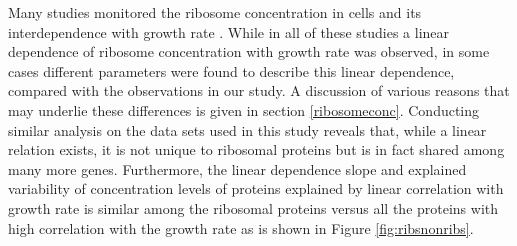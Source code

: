 Many studies monitored the ribosome concentration in cells and its interdependence with growth rate \cite{Scott2010,Schaechter1958,Bremer,Zaslaver2009,Bremer1987}.
While in all of these studies a linear dependence of ribosome concentration with growth rate was observed, in some cases different parameters were found to describe this linear dependence, compared with the observations in our study.
A discussion of various reasons that may underlie these differences is given in section \ref{ribosomeconc}.
Conducting similar analysis on the data sets used in this study reveals that, while a linear relation exists, it is not unique to ribosomal proteins but is in fact shared among many more genes.
Furthermore, the linear dependence slope and explained variability of concentration levels of proteins explained by linear correlation with growth rate is similar among the ribosomal proteins versus all the proteins with high correlation with the growth rate as is shown in Figure \ref{fig:ribsnonribs}.